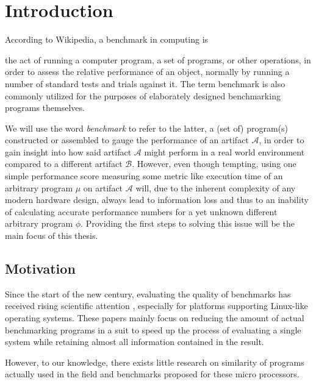 \documentclass[../bachelor_paper.tex]{subfiles}
\begin{document}
\chapter{Introduction}
    \label{ch:intro}

According to Wikipedia, a benchmark in computing is
\begin{displayquote}
the act of running a computer program, a set of programs, or other operations, in order to assess the relative performance of an object, normally by running a number of standard tests and trials against it. The term benchmark is also commonly utilized for the purposes of elaborately designed benchmarking programs themselves. \cite{BenchmarkComputing2021}
\end{displayquote}
We will use the word \emph{benchmark} to refer to the latter, a (set of) program(s) constructed or assembled to gauge the performance of an artifact $\mathcal{A}$, in order to gain insight into how said artifact $\mathcal{A}$ might perform in a real world environment compared to a different artifact $\mathcal{B}$. However, even though tempting, using one simple performance score measuring some metric like execution time of an arbitrary program $\mu$ on artifact $\mathcal{A}$ will, due to the inherent complexity of any modern hardware design, always lead to information loss and thus to an inability of calculating accurate performance numbers for a yet unknown different arbitrary program $\phi$. Providing the first steps to solving this issue will be the main focus of this thesis.

\section{Motivation}
Since the start of the new century, evaluating the quality of benchmarks has received rising scientific attention \cite{eeckhoutDesigningComputerArchitecture2003,dujmovicEvolutionEvaluationSPEC1998,vandierendonckManyBenchmarksStress,phansalkarMeasuringProgramSimilarity2005,eeckhoutQuantifyingImpactInput}, especially for platforms supporting Linux-like operating systems. These papers mainly focus on reducing the amount of actual benchmarking programs in a suit to speed up the process of evaluating a single system while retaining almost all information contained in the result. 

However, to our knowledge, there exists little research on similarity of programs actually used in the field and benchmarks proposed for these micro processors.
\end{document}
